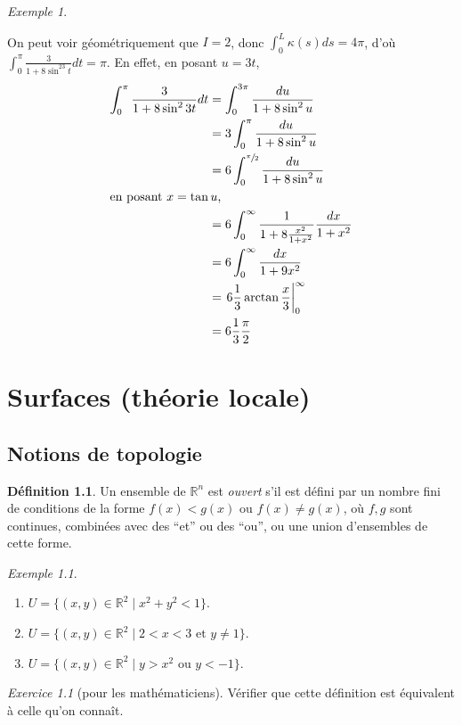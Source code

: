 \documentclass{report}
\theoremstyle{definition}
\newtheorem*{dfn}{D\'efinition}
\theoremstyle{remark}
\newtheorem*{exem}{Exemple}
\newtheorem*{exer}{Exercice}
\def\RR{\mathbb{R}}
\begin{document}
\begin{exem}
\begin{enumerate}
			On peut voir g\'eom\'etriquement que $I=2$, donc $\int_{0}^{L}\kappa(s)ds=4\pi$, d'o\`u $\int_{0}^{\pi}\frac{3}{1+8\sin^23t}dt=\pi$. En effet, en posant $u=3t$,
			\begin{align*}
				\int_{0}^{\pi}\frac{3}{1+8\sin^23t}dt&= \int_{0}^{3\pi}\frac{du}{1+8\sin^2u}\\
				&= 3\int_{0}^{\pi}\frac{du}{1+8\sin^2u}\\
				&= 6\int_{0}^{\sfrac{\pi}{2}}\frac{du}{1+8\sin^2u}\\
				\shortintertext{en posant $x=\tan u$,}
				&= 6\int_{0}^{\infty}\frac{1}{1+8\frac{x^2}{1+x^2}} \frac{dx}{1+x^2}\\
				&= 6\int_{0}^{\infty}\frac{dx}{1+9x^2}\\
				&= \left.6 \frac{1}{3} \arctan\frac{x}{3}\right|_{0}^{\infty}\\
				&= 6 \frac{1}{3} \frac{\pi}{2}
			\end{align*}
		\end{enumerate}
	\end{exem}

	\chapter{Surfaces (th\'eorie locale)}
	\section{Notions de topologie}
	\begin{dfn}
		Un ensemble de $\RR^n$ est \emph{ouvert} s'il est d\'efini par un nombre fini de conditions de la forme $f(x)<g(x)$ ou $f(x)\neq g(x)$, o\`u $f,g$ sont continues, combin\'ees avec des ``et'' ou des ``ou'', ou une union d'ensembles de cette forme.
	\end{dfn}

	\begin{exem}
		\begin{enumerate}
			\item $U=\{(x,y)\in\RR^2 \mid x^2+y^2<1\}$.
			\item $U=\{(x,y)\in\RR^2 \mid 2<x<3 \text{ et } y\neq1\}$.
			\item $U=\{(x,y)\in\RR^2 \mid y>x^2 \text{ ou } y<-1\}$.
		\end{enumerate}
	\end{exem}

	\begin{exer}[pour les math\'ematiciens]
		V\'erifier que cette d\'efinition est \'equivalent \`a celle qu'on conna\^it.
	\end{exer}
\end{document}
